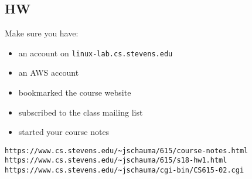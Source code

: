 \documentclass[xga]{xdvislides}
\begin{document}
\subsection{HW}
Make sure you have:
\begin{itemize}
	\item an account on {\tt linux-lab.cs.stevens.edu}
	\item an AWS account
	\item bookmarked the course website
	\item subscribed to the class mailing list
	\item started your course notes
\end{itemize}

\vspace*{\fill}
{\tt https://www.cs.stevens.edu/\~{}jschauma/615/course-notes.html} \\
{\tt https://www.cs.stevens.edu/\~{}jschauma/615/s18-hw1.html} \\
{\tt https://www.cs.stevens.edu/\~{}jschauma/cgi-bin/CS615-02.cgi} \\
\vspace*{\fill}
\end{document}
